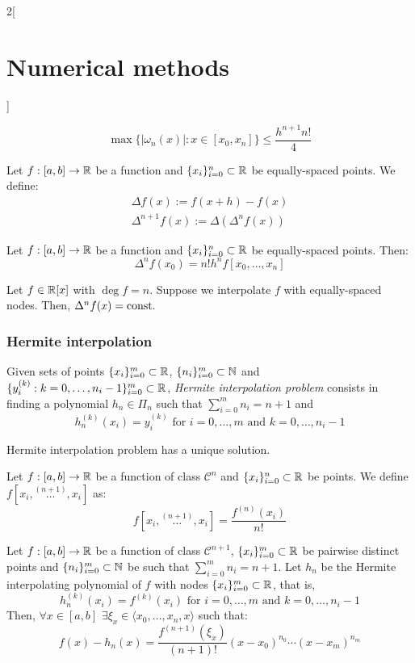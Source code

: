 \documentclass[../../../main.tex]{subfiles}
\begin{document}
\begin{multicols}{2}[\section{Numerical methods}]
\begin{proposition}
    $$\max\{|\omega_n(x)|:x\in[x_0,x_n]\}\leq\frac{h^{n+1}n!}{4}$$
  \end{proposition}
  \begin{definition}
    Let $f:[a,b]\rightarrow\mathbb{R}$ be a function and $\{x_i\}_{i=0}^n\subset\mathbb{R}$ be equally-spaced points. We define:
    \begin{gather*}
      \Delta f(x):=f(x+h)-f(x)\\
      \Delta^{n+1}f(x):=\Delta(\Delta^nf(x))
    \end{gather*}
  \end{definition}
  \begin{lemma}
    Let $f:[a,b]\rightarrow\mathbb{R}$ be a function and $\{x_i\}_{i=0}^n\subset\mathbb{R}$ be equally-spaced points. Then: $$\Delta^nf(x_0)=n!h^nf[x_0,\ldots,x_n]$$
  \end{lemma}
  \begin{corollary}
    Let $f\in\mathbb{R}[x]$ with $\deg f=n$. Suppose we interpolate $f$ with equally-spaced nodes. Then, $\Delta^nf(x)=\text{const.}$
  \end{corollary}
  \subsubsection{Hermite interpolation}
  \begin{definition}
    Given sets of points $\{x_i\}_{i=0}^m\subset\mathbb{R}$, $\{n_i\}_{i=0}^m\subset\mathbb{N}$ and $\{y_i^{(k)}:k=0,\ldots,n_i-1\}_{i=0}^m\subset\mathbb{R}$, \emph{Hermite interpolation problem} consists in finding a polynomial $h_n\in\Pi_n$ such that $\sum_{i=0}^mn_i=n+1$ and $$h_n^{(k)}(x_i)=y_i^{(k)}\text{ for }i=0,\ldots,m\text{ and }k=0,\ldots,n_i-1$$
  \end{definition}
  \begin{proposition}
    Hermite interpolation problem has a unique solution.
  \end{proposition}
  \begin{definition}
    Let $f:[a,b]\rightarrow\mathbb{R}$ be a function of class $\mathcal{C}^n$ and $\{x_i\}_{i=0}^n\subset\mathbb{R}$ be points. We define $f[x_i,\overset{(n+1)}{\ldots},x_i]$ as: $$f[x_i,\overset{(n+1)}{\ldots},x_i]=\frac{f^{(n)}(x_i)}{n!}$$
  \end{definition}
  \begin{theorem}
    Let $f:[a,b]\rightarrow\mathbb{R}$ be a function of class $\mathcal{C}^{n+1}$, $\{x_i\}_{i=0}^m\subset\mathbb{R}$ be pairwise distinct points and $\{n_i\}_{i=0}^m\subset\mathbb{N}$ be such that $\sum_{i=0}^mn_i=n+1$. Let $h_n$ be the Hermite interpolating polynomial of $f$ with nodes $\{x_i\}_{i=0}^m\subset\mathbb{R}$, that is, $$h_n^{(k)}(x_i)=f^{(k)}(x_i)\text{ for }i=0,\ldots,m\text{ and }k=0,\ldots,n_i-1$$ Then, $\forall x\in[a,b]$ $\exists\xi_x\in\langle x_0,\ldots,x_n,x\rangle$ such that: $$f(x)-h_n(x)=\frac{f^{(n+1)}(\xi_x)}{(n+1)!}(x-x_0)^{n_0}\cdots(x-x_m)^{n_m}$$
  \end{theorem}

\end{multicols}
\end{document}
